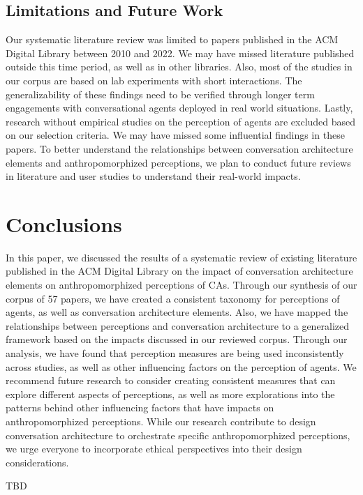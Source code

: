 \documentclass[sigconf,screen,review, anonymous]{acmart}
\begin{document}
\subsection{Limitations and Future Work}

Our systematic literature review was limited to papers published in the ACM Digital Library between 2010 and 2022. We may have missed literature published outside this time period, as well as in other libraries. Also, most of the studies in our corpus are based on lab experiments with short interactions. The generalizability of these findings need to be verified through longer term engagements with conversational agents deployed in real world situations. Lastly, research without empirical studies on the perception of agents are excluded based on our selection criteria. We may have missed some influential findings in these papers. To better understand the relationships between conversation architecture elements and anthropomorphized perceptions, we plan to conduct future reviews in literature and user studies to understand their real-world impacts.

\section{Conclusions}

In this paper, we discussed the results of a systematic review of existing literature published in the ACM Digital Library on the impact of conversation architecture elements on anthropomorphized perceptions of CAs.  Through our synthesis of our corpus of 57 papers, we have created a consistent taxonomy for perceptions of agents, as well as conversation architecture elements. Also, we have mapped the relationships between perceptions and conversation architecture to a generalized framework based on the impacts discussed in our reviewed corpus. Through our analysis, we have found that perception measures are being used inconsistently across studies, as well as other influencing factors on the perception of agents. We recommend future research to consider creating consistent measures that can explore different aspects of perceptions, as well as more explorations into the patterns behind other influencing factors that have impacts on anthropomorphized perceptions. While our research contribute to design conversation architecture to orchestrate specific anthropomorphized perceptions, we urge everyone to incorporate ethical perspectives into their design considerations.

\begin{acks}
TBD
\end{acks}









\appendix
\end{document}
